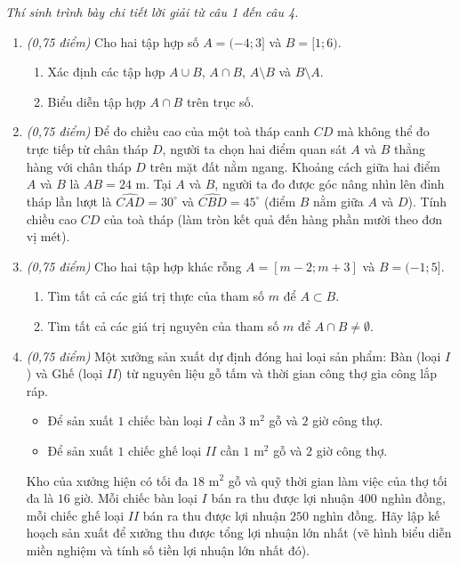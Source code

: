 \documentclass[12pt,a4paper]{article}
\newcommand{\parttitle}[1]{\par\vspace{1.5pt}\needspace{2\baselineskip}{\large\bfseries\color{ink}#1}\par\nopagebreak\vspace{1pt}}
\begin{document}
\parttitle{PHẦN IV. Tự luận}
\textit{Thí sinh trình bày chi tiết lời giải từ câu 1 đến câu 4.}
\begin{enumerate}
\item \textit{(0,75 điểm)} Cho hai tập hợp số $A = (-4; 3]$ và $B = [1; 6)$.
\begin{enumerate}
    \item Xác định các tập hợp $A \cup B$, $A \cap B$, $A \setminus B$ và $B \setminus A$.
    \item Biểu diễn tập hợp $A \cap B$ trên trục số.
\end{enumerate}

\item \textit{(0,75 điểm)} Để đo chiều cao của một toà tháp canh $CD$ mà không thể đo trực tiếp từ chân tháp $D$, người ta chọn hai điểm quan sát $A$ và $B$ thẳng hàng với chân tháp $D$ trên mặt đất nằm ngang. Khoảng cách giữa hai điểm $A$ và $B$ là $AB = 24\text{ m}$. Tại $A$ và $B$, người ta đo được góc nâng nhìn lên đỉnh tháp lần lượt là $\widehat{CAD} = 30^\circ$ và $\widehat{CBD} = 45^\circ$ (điểm $B$ nằm giữa $A$ và $D$). Tính chiều cao $CD$ của toà tháp (làm tròn kết quả đến hàng phần mười theo đơn vị mét).

\item \textit{(0,75 điểm)} Cho hai tập hợp khác rỗng $A = [m - 2; m + 3]$ và $B = (-1; 5]$.
\begin{enumerate}
    \item Tìm tất cả các giá trị thực của tham số $m$ để $A \subset B$.
    \item Tìm tất cả các giá trị nguyên của tham số $m$ để $A \cap B \ne \emptyset$.
\end{enumerate}

\item \textit{(0,75 điểm)} Một xưởng sản xuất dự định đóng hai loại sản phẩm: Bàn (loại $I$) và Ghế (loại $II$) từ nguyên liệu gỗ tấm và thời gian công thợ gia công lắp ráp.
\begin{itemize}[leftmargin=0.5cm, itemsep=1pt, topsep=1pt]
    \item Để sản xuất $1$ chiếc bàn loại $I$ cần $3\text{ m}^2$ gỗ và $2$ giờ công thợ.
    \item Để sản xuất $1$ chiếc ghế loại $II$ cần $1\text{ m}^2$ gỗ và $2$ giờ công thợ.
\end{itemize}
Kho của xưởng hiện có tối đa $18\text{ m}^2$ gỗ và quỹ thời gian làm việc của thợ tối đa là $16$ giờ. Mỗi chiếc bàn loại $I$ bán ra thu được lợi nhuận $400$ nghìn đồng, mỗi chiếc ghế loại $II$ bán ra thu được lợi nhuận $250$ nghìn đồng. Hãy lập kế hoạch sản xuất để xưởng thu được tổng lợi nhuận lớn nhất (vẽ hình biểu diễn miền nghiệm và tính số tiền lợi nhuận lớn nhất đó).
\end{enumerate}
\end{document}
